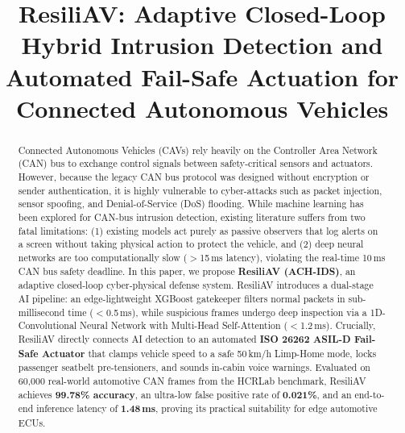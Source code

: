 \documentclass[conference]{IEEEtran}
\begin{document}
\title{ResiliAV: Adaptive Closed-Loop Hybrid Intrusion Detection and Automated Fail-Safe Actuation for Connected Autonomous Vehicles}

\author{
}

\maketitle

\begin{abstract}
Connected Autonomous Vehicles (CAVs) rely heavily on the Controller Area Network (CAN) bus to exchange control signals between safety-critical sensors and actuators. However, because the legacy CAN bus protocol was designed without encryption or sender authentication, it is highly vulnerable to cyber-attacks such as packet injection, sensor spoofing, and Denial-of-Service (DoS) flooding. While machine learning has been explored for CAN-bus intrusion detection, existing literature suffers from two fatal limitations: (1) existing models act purely as passive observers that log alerts on a screen without taking physical action to protect the vehicle, and (2) deep neural networks are too computationally slow ($>$15\,ms latency), violating the real-time 10\,ms CAN bus safety deadline. In this paper, we propose \textbf{ResiliAV (ACH-IDS)}, an adaptive closed-loop cyber-physical defense system. ResiliAV introduces a dual-stage AI pipeline: an edge-lightweight XGBoost gatekeeper filters normal packets in sub-millisecond time ($<$0.5\,ms), while suspicious frames undergo deep inspection via a 1D-Convolutional Neural Network with Multi-Head Self-Attention ($<$1.2\,ms). Crucially, ResiliAV directly connects AI detection to an automated \textbf{ISO 26262 ASIL-D Fail-Safe Actuator} that clamps vehicle speed to a safe 50\,km/h Limp-Home mode, locks passenger seatbelt pre-tensioners, and sounds in-cabin voice warnings. Evaluated on 60,000 real-world automotive CAN frames from the HCRLab benchmark, ResiliAV achieves \textbf{99.78\% accuracy}, an ultra-low false positive rate of \textbf{0.021\%}, and an end-to-end inference latency of \textbf{1.48\,ms}, proving its practical suitability for edge automotive ECUs.
\end{abstract}
\end{document}
